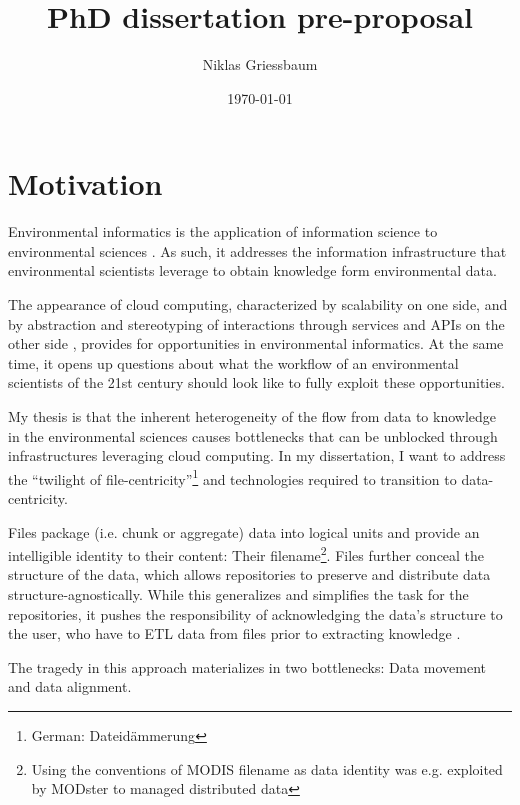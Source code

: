 \documentclass[a4paper,10pt]{article}
\title{PhD dissertation pre-proposal}
\author{Niklas Griessbaum}
\date{\today}
\begin{document}
\maketitle

\tableofcontents

\newpage
\printglossaries


\newpage

\section{Motivation}

Environmental informatics is the application of information science to environmental sciences \citep{Frew2012}.
As such, it addresses the information infrastructure that environmental scientists leverage
to obtain knowledge form environmental data.

The appearance of cloud computing, characterized by scalability on one side, 
and by abstraction and stereotyping of interactions through services and \glspl{API} on the other side \citep{Foster2017}, 
provides for opportunities in environmental informatics. 
At the same time, it opens up questions about what the workflow
of an environmental scientists of the 21st century should look like to fully exploit these opportunities.

My thesis is that the inherent heterogeneity of the flow from data to knowledge
in the environmental sciences causes bottlenecks that can be unblocked through 
infrastructures leveraging cloud computing. 
In my dissertation, I want to address the ``twilight of file-centricity''\footnote{German: Dateidämmerung } and technologies required to transition to data-centricity.

Files package (i.e. chunk or aggregate) data into logical units and provide an intelligible identity to their content: Their filename\footnote{Using the conventions of \gls{MODIS} filename as data identity was e.g. exploited by MODster \citep{Frew2005, Frew2002} to managed distributed data}.
Files further conceal the structure of the data, which allows repositories to preserve and distribute data structure-agnostically. 
While this generalizes and simplifies the task for the repositories, it pushes the responsibility of acknowledging the data's structure to the user,
who have to \gls{ETL} data from files prior to extracting knowledge \citep{Rilee2016, Szalay2009}.

The tragedy in this approach materializes in two bottlenecks: Data movement and data alignment.
\end{document}
